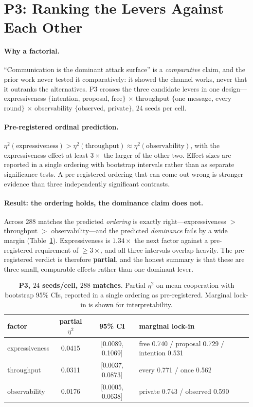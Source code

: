 \section{P3: Ranking the Levers Against Each Other}
\label{sec:p3}

\paragraph{Why a factorial.}
``Communication is the dominant attack surface'' is a \emph{comparative} claim, and
the prior work never tested it comparatively: it showed the channel works, never that
it outranks the alternatives. P3 crosses the three candidate levers in one design---
expressiveness $\{$intention, proposal, free$\}$ $\times$ throughput $\{$one message,
every round$\}$ $\times$ observability $\{$observed, private$\}$, $24$ seeds per cell.

\paragraph{Pre-registered ordinal prediction.}
$\eta^2(\text{expressiveness}) > \eta^2(\text{throughput}) \approx
\eta^2(\text{observability})$, with the expressiveness effect at least $3\times$ the
larger of the other two. Effect sizes are reported in a single ordering with bootstrap
intervals rather than as separate significance tests. A pre-registered ordering that
can come out wrong is stronger evidence than three independently significant
contrasts.

\paragraph{Result: the ordering holds, the dominance claim does not.}
Across $288$ matches the predicted \emph{ordering} is exactly right---expressiveness
$>$ throughput $>$ observability---and the predicted \emph{dominance} fails by a wide
margin (Table~\ref{tab:p3}). Expressiveness is $1.34\times$ the next factor against a
pre-registered requirement of $\ge3\times$, and all three intervals overlap heavily.
The pre-registered verdict is therefore \textbf{partial}, and the honest summary is
that these are three small, comparable effects rather than one dominant lever.

\begin{table}[t]
\centering
\caption{\textbf{P3, $24$ seeds/cell, $288$ matches.} Partial $\eta^2$ on mean
cooperation with bootstrap 95\% CIs, reported in a single ordering as pre-registered.
Marginal lock-in is shown for interpretability.}
\label{tab:p3}
\small
\begin{tabular}{lccl}
\toprule
factor & partial $\eta^2$ & 95\% CI & marginal lock-in \\
\midrule
expressiveness & 0.0415 & [0.0089, 0.1069] & free 0.740 / proposal 0.729 / intention 0.531 \\
throughput     & 0.0311 & [0.0037, 0.0873] & every 0.771 / once 0.562 \\
observability  & 0.0176 & [0.0005, 0.0638] & private 0.743 / observed 0.590 \\
\bottomrule
\end{tabular}
\end{table}

